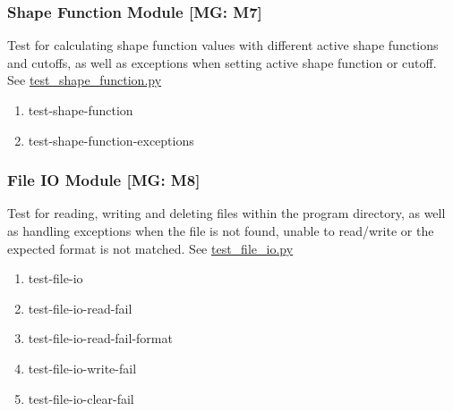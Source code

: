 \documentclass[12pt, titlepage]{article}
\begin{document}
\subsubsection{Shape Function Module [MG: M7]} \label{UT:Shape}
Test for calculating shape function values with different active shape functions and cutoffs, as well as exceptions when setting active shape function or cutoff. See \href{https://github.com/omltcat/turbulent-flow/blob/main/test/test_shape_function.py}{test\_shape\_function.py}

\begin{enumerate}
  \item test-shape-function
  \item test-shape-function-exceptions
\end{enumerate}

\subsubsection{File IO Module [MG: M8]} \label{UT:FileIO}
Test for reading, writing and deleting files within the program directory, as well as handling exceptions when the file is not found, unable to read/write or the expected format is not matched. See \href{https://github.com/omltcat/turbulent-flow/blob/main/test/test_file_io.py}{test\_file\_io.py}

\begin{enumerate}
  \item test-file-io
  \item test-file-io-read-fail
  \item test-file-io-read-fail-format
  \item test-file-io-write-fail
  \item test-file-io-clear-fail
\end{enumerate}





		
\end{document}
